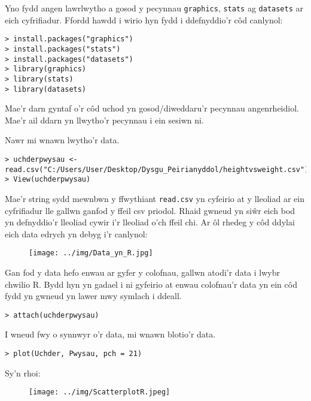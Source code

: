 Yno fydd angen lawrlwytho a gosod y pecynnau \texttt{graphics}, \texttt{stats} ag \texttt{datasets} ar eich cyfrifiadur. Ffordd hawdd i wirio hyn fydd i ddefnyddio'r c\^{o}d canlynol: 

\begin{verbatim}
> install.packages("graphics")
> install.packages("stats")
> install.packages("datasets")
> library(graphics)
> library(stats)
> library(datasets)
\end{verbatim}

Mae'r darn gyntaf o'r c\^{o}d uchod yn gosod/diweddaru'r pecynnau angenrheidiol. Mae'r ail ddarn yn llwytho'r pecynnau i ein sesiwn ni.

Nawr mi wnawn lwytho'r data.

\begin{verbatim}
> uchderpwysau <- read.csv("C:/Users/User/Desktop/Dysgu_Peirianyddol/heightvsweight.csv")
> View(uchderpwysau)
\end{verbatim}

Mae'r string sydd mewnbwn y ffwythiant \texttt{read.csv} yn cyfeirio at y lleoliad ar ein cyfrifiadur lle gallwn ganfod y ffeil csv priodol. Rhaid gwneud yn si\^{w}r eich bod yn defnyddio'r lleoliad cywir i'r lleoliad o'ch ffeil chi.
Ar \^{o}l rhedeg y c\^{o}d ddylai eich data edrych yn debyg i'r canlynol: 

\begin{figure}[H]
\begin{center}
\texttt{[image: ../img/Data\_yn\_R.jpg]}
\end{center}
\label{fig:DataR}
\end{figure}

Gan fod y data hefo enwau ar gyfer y colofnau, gallwn atodi'r data i lwybr chwilio R. Bydd hyn yn gadael i ni gyfeirio at enwau colofnau'r data yn ein c\^{o}d fydd yn gwneud yn lawer mwy symlach i ddeall.

\begin{verbatim}
> attach(uchderpwysau)
\end{verbatim}

I wneud fwy o synnwyr o'r data, mi wnawn blotio'r data.

\begin{verbatim}
> plot(Uchder, Pwysau, pch = 21)
\end{verbatim}

Sy'n rhoi:

\begin{figure}[H]
\begin{center}
\texttt{[image: ../img/ScatterplotR.jpeg]}
\end{center}
\label{fig:ScatterplotR}
\end{figure}

